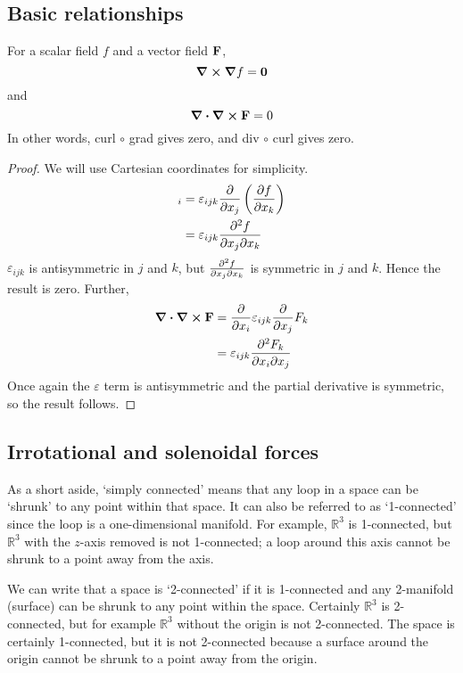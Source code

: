 \subsection{Basic relationships}
\begin{proposition}
	For a scalar field \(f\) and a vector field \(\vb F\),
	\[
		\curl{\grad{f}} = \vb 0
	\]
	and
	\[
		\div{\curl{\vb F}} = 0
	\]
	In other words, curl \(\circ\) grad gives zero, and div \(\circ\) curl gives zero.
\end{proposition}
\begin{proof}
	We will use Cartesian coordinates for simplicity.
	\begin{align*}
		[\curl{\grad{f}}]_i & = \varepsilon_{ijk} \pdv{x_j} \left( \pdv{f}{x_k} \right) \\
		                    & = \varepsilon_{ijk} \pdv{f}{x_j}{x_k}
	\end{align*}
	\(\varepsilon_{ijk}\) is antisymmetric in \(j\) and \(k\), but \(\pdv{f}{x_j}{x_k}\) is symmetric in \(j\) and \(k\).
	Hence the result is zero.
	Further,
	\begin{align*}
		\div{\curl{\vb F}} & = \pdv{x_i} \varepsilon_{ijk} \pdv{x_j} F_k \\
		                   & = \varepsilon_{ijk} \pdv{F_k}{x_i}{x_j}
	\end{align*}
	Once again the \(\varepsilon\) term is antisymmetric and the partial derivative is symmetric, so the result follows.
\end{proof}

\subsection{Irrotational and solenoidal forces}
As a short aside, `simply connected' means that any loop in a space can be `shrunk' to any point within that space.
It can also be referred to as `1-connected' since the loop is a one-dimensional manifold.
For example, \(\mathbb R^3\) is 1-connected, but \(\mathbb R^3\) with the \(z\)-axis removed is not 1-connected; a loop around this axis cannot be shrunk to a point away from the axis.

We can write that a space is `2-connected' if it is 1-connected and any 2-manifold (surface) can be shrunk to any point within the space.
Certainly \(\mathbb R^3\) is 2-connected, but for example \(\mathbb R^3\) without the origin is not 2-connected.
The space is certainly 1-connected, but it is not 2-connected because a surface around the origin cannot be shrunk to a point away from the origin.

